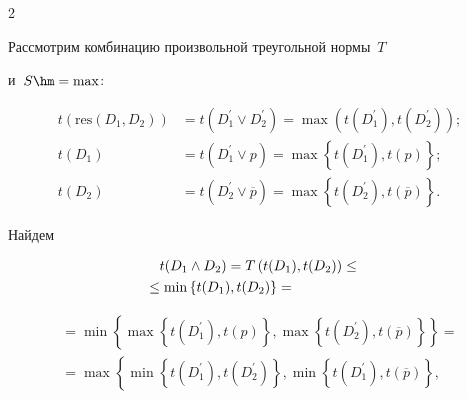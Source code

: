 \begin{multicols}{2}
  \smallskip


  


  Рассмотрим комбинацию произвольной треугольной нормы~$T$ 


и~$S\hm=\max$:


  \begin{align*}


  t\left( \mathrm{res}\left (D_1, D_2\right)\right) &=t\left( D_1^\prime \vee D_2^\prime\right) =\max \left( 


t(D_1^\prime), t(D_2^\prime)\right);\\


  t(D_1) &=t(D_1^\prime\vee p) =\max \left\{ t(D_1^\prime), t(p)\right\};\\


  t(D_2)&= t(D_2^\prime\vee \overline{p})=\max \left\{ t(D_2^\prime), 


t(\overline{p})\right\}.


  \end{align*}


  


  Найдем 


  \begin{multline*}


  t(D_1\wedge D_2) =T\left( t(D_1), t(D_2)\right) \leq {}\\


  \hspace*{-10mm}{}\leq \min\left\{ t(D_1), t(D_2)\right\}={}\hspace*{10mm}


  \end{multline*}





\noindent


  \begin{multline*}


  {}=


  \min\left\{ \max \left\{ t(D_1^\prime), t(p)\right\}, \max \left\{ t(D_2^\prime), 


t\left(\overline{p}\right)\right\}\right\}={}\\[1pt]


  {}=


  \max \left\{ \min\left\{ t(D_1^\prime), t(D_2^\prime)\right\}, 


  \min\left\{ t\left(D_1^\prime\right), t\left(\overline{p}\right)\right\},\right.\\[1pt]



\end{multline*}
\end{multicols}
